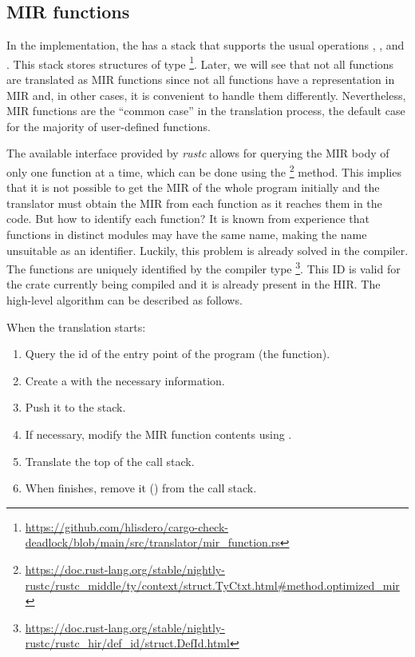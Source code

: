 \subsection{MIR functions}

In the implementation, the  has a stack
that supports the usual operations , , and .
This stack stores structures of type \footnote{\url{https://github.com/hlisdero/cargo-check-deadlock/blob/main/src/translator/mir_function.rs}}.
Later, we will see that not all functions are translated as \acrshort{MIR} functions
since not all functions have a representation in \acrshort{MIR}
and, in other cases, it is convenient to handle them differently.
Nevertheless, \acrshort{MIR} functions are the ``common case'' in the translation process,
the default case for the majority of user-defined functions.

The available interface provided by \emph{rustc}
allows for querying the \acrshort{MIR} body of only one function at a time,
which can be done using the \footnote{\url{https://doc.rust-lang.org/stable/nightly-rustc/rustc_middle/ty/context/struct.TyCtxt.html\#method.optimized\_mir}}
method.
This implies that it is not possible to get the \acrshort{MIR} of the whole program initially
and the translator must obtain the \acrshort{MIR} from each function as it reaches them in the code.
But how to identify each function?
It is known from experience that functions in distinct modules may have the same name,
making the name unsuitable as an identifier.
Luckily, this problem is already solved in the compiler.
The functions are uniquely identified by the compiler type \footnote{\url{https://doc.rust-lang.org/stable/nightly-rustc/rustc_hir/def_id/struct.DefId.html}}.
This ID is valid for the crate currently being compiled and it is already present in the \acrshort{HIR}.
The high-level algorithm can be described as follows.

When the translation starts:

\begin{enumerate}
    \item Query the id of the entry point of the program (the  function).
    \item Create a  with the necessary information.
    \item Push it to the stack.
    \item If necessary, modify the \acrshort{MIR} function contents using .
    \item Translate the top of the call stack.
    \item When  finishes, remove it () from the call stack.
\end{enumerate}

